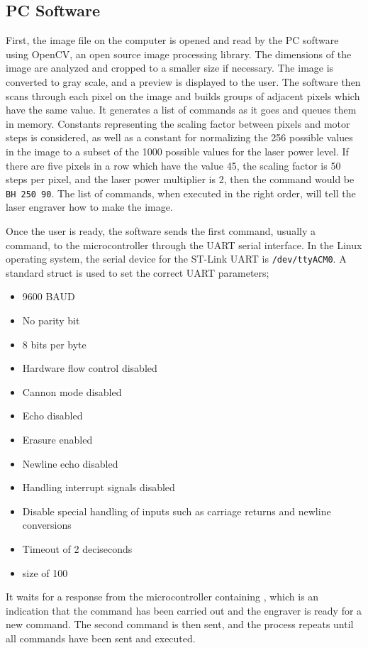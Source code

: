 \documentclass[11pt]{LaTeX-Classes/math-hw}
\begin{document}
\subsection{PC Software}
First, the image file on the computer is opened and read by the PC software using OpenCV, an open source
image processing library. The dimensions of the image are analyzed and cropped to a smaller size
if necessary.
The image is converted to gray scale, and a preview is displayed to the user.
The software then scans through each pixel on the image and builds groups of adjacent pixels
which have the same value. It generates a list of commands as it goes and queues them in memory.
Constants representing the scaling factor between pixels and motor steps is considered, as well
as a constant for normalizing the 256 possible values in the image to a subset of the 1000 possible
values for the laser power level.
If there are five pixels in a row which have the value 45, the scaling factor is 50 steps
per pixel, and the laser power multiplier is 2, then the command would be \texttt{BH 250 90}.
The list of commands, when executed in the right order, will tell the laser engraver how to make the image.

Once the user is ready, the software sends the first command, usually a  command, to the
microcontroller through the UART serial interface.
In the Linux operating system, the serial device for the ST-Link UART is \texttt{/dev/ttyACM0}.
A standard  struct is used to set the correct UART parameters;
\begin{itemize}
  \item 9600 BAUD
  \item No parity bit
  \item 8 bits per byte
  \item Hardware flow control disabled
  \item Cannon mode disabled
  \item Echo disabled
  \item Erasure enabled
  \item Newline echo disabled
  \item Handling interrupt signals disabled
  \item Disable special handling of inputs such as carriage returns and newline conversions
  \item Timeout of 2 deciseconds
  \item {} size of 100
\end{itemize}

It waits for a response from the microcontroller containing ,
which is an indication that the command has been
carried out and the engraver is ready for a new command.
The second command is then sent, and the process repeats until all commands have been sent and executed.
\end{document}
